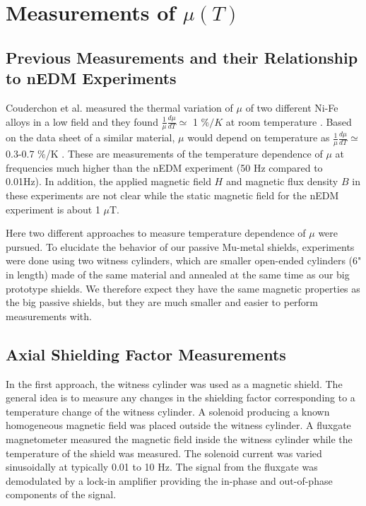 \documentclass[review]{elsarticle}
\begin{document}
\section{Measurements of $\mu(T)$}

\subsection{Previous Measurements and their Relationship to nEDM Experiments}
Couderchon et al. measured the thermal variation of $\mu$ of two different Ni-Fe alloys in a low field and they found $\frac{1}{\mu}\frac{d \mu}{dT}\simeq$ 1 $\%/K$ at room temperature \cite{bib:couderchon}. Based on the data sheet of a similar material, $\mu$ would depend on temperature as $\frac{1}{\mu} \frac{d \mu}{dT} \simeq $ 0.3-0.7 \%/K \cite{bib:kruppvdm}. These are measurements of the temperature dependence of $\mu$ at frequencies much higher than the nEDM experiment (50 Hz compared to 0.01Hz). In addition, the applied magnetic field $H$ and magnetic flux density $B$ in these experiments are not clear while the static magnetic field for the nEDM experiment is about 1 $\mu$T.

Here two different approaches to measure temperature dependence of $\mu$ were pursued. To elucidate the behavior of our passive Mu-metal shields, experiments were done using two witness cylinders, which are smaller open-ended cylinders (6" in length) made of the same material and annealed at the same time as our big prototype shields. We therefore expect they have the same magnetic properties as the big passive shields, but they are much smaller and easier to perform measurements with.

\subsection{Axial Shielding Factor Measurements}
In the first approach, the witness cylinder was used as a magnetic shield. 
The general idea is to measure any changes in the shielding factor corresponding to a temperature change of the witness cylinder. 
A solenoid producing a known homogeneous magnetic field was placed outside the witness cylinder.
A fluxgate magnetometer measured the magnetic field inside the witness cylinder while the temperature of the shield was measured.
The solenoid current was varied sinusoidally at typically 0.01 to 10 Hz.
The signal from the fluxgate was demodulated by a lock-in amplifier providing the in-phase and out-of-phase components of the signal.
\end{document}
